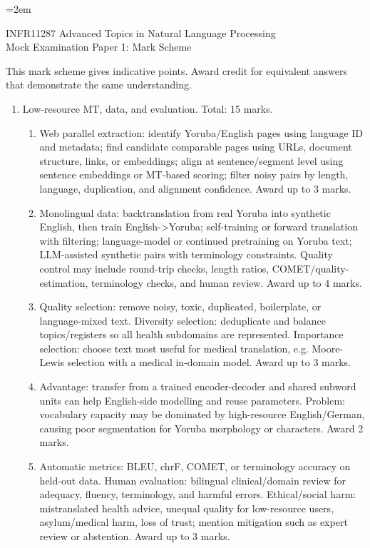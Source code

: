 \documentclass[11pt,a4paper]{article}
\begin{document}
\emergencystretch=2em

\begin{center}
{\Large INFR11287 Advanced Topics in Natural Language Processing}\\[0.5em]
{\Large Mock Examination Paper 1: Mark Scheme}\\[1em]
\end{center}

\noindent This mark scheme gives indicative points. Award credit for equivalent answers that demonstrate the same understanding.

\begin{enumerate}[leftmargin=*]
\item Low-resource MT, data, and evaluation. Total: 15 marks.
\begin{enumerate}
\item Web parallel extraction: identify Yoruba/English pages using language ID and metadata; find candidate comparable pages using URLs, document structure, links, or embeddings; align at sentence/segment level using sentence embeddings or MT-based scoring; filter noisy pairs by length, language, duplication, and alignment confidence. Award up to 3 marks.
\item Monolingual data: backtranslation from real Yoruba into synthetic English, then train English->Yoruba; self-training or forward translation with filtering; language-model or continued pretraining on Yoruba text; LLM-assisted synthetic pairs with terminology constraints. Quality control may include round-trip checks, length ratios, COMET/quality-estimation, terminology checks, and human review. Award up to 4 marks.
\item Quality selection: remove noisy, toxic, duplicated, boilerplate, or language-mixed text. Diversity selection: deduplicate and balance topics/registers so all health subdomains are represented. Importance selection: choose text most useful for medical translation, e.g. Moore-Lewis selection with a medical in-domain model. Award up to 3 marks.
\item Advantage: transfer from a trained encoder-decoder and shared subword units can help English-side modelling and reuse parameters. Problem: vocabulary capacity may be dominated by high-resource English/German, causing poor segmentation for Yoruba morphology or characters. Award 2 marks.
\item Automatic metrics: BLEU, chrF, COMET, or terminology accuracy on held-out data. Human evaluation: bilingual clinical/domain review for adequacy, fluency, terminology, and harmful errors. Ethical/social harm: mistranslated health advice, unequal quality for low-resource users, asylum/medical harm, loss of trust; mention mitigation such as expert review or abstention. Award up to 3 marks.
\end{enumerate}


\end{enumerate}
\end{document}
